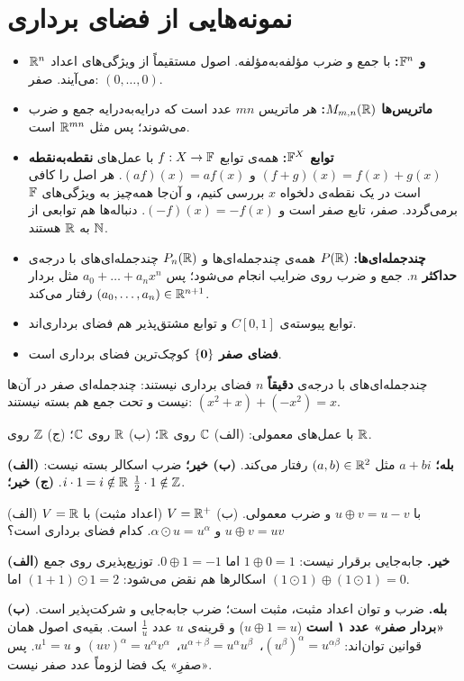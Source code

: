 \section{نمونه‌هایی از فضای برداری}

\begin{itemize}
  \item \textbf{$\mathbb{R}^n$ و $\mathbb{F}^n$:} با جمع و ضرب مؤلفه‌به‌مؤلفه. اصول مستقیماً از ویژگی‌های اعداد می‌آیند. صفر: $(0,\dots,0)$.
  \item \textbf{ماتریس‌ها $M_{m,n}(\mathbb{R})$:} هر ماتریس $mn$ عدد است که درایه‌به‌درایه جمع و ضرب می‌شوند؛ پس مثل $\mathbb{R}^{mn}$ است.
  \item \textbf{توابع $\mathbb{F}^X$:} همه‌ی توابع $f:X\to\mathbb{F}$ با عمل‌های \textbf{نقطه‌به‌نقطه}
  $(f+g)(x)=f(x)+g(x)$ و $(af)(x)=af(x)$. هر اصل را کافی است در یک نقطه‌ی دلخواه $x$ بررسی کنیم، و آن‌جا همه‌چیز به ویژگی‌های $\mathbb{F}$ برمی‌گردد. صفر، تابع صفر است و $(-f)(x)=-f(x)$. دنباله‌ها هم توابعی از $\mathbb{N}$ به $\mathbb{R}$ هستند.
  \item \textbf{چندجمله‌ای‌ها:} $P(\mathbb{R})$ همه‌ی چندجمله‌ای‌ها و $P_n(\mathbb{R})$ چندجمله‌ای‌های با درجه‌ی \textbf{حداکثر} $n$. جمع و ضرب روی ضرایب انجام می‌شود؛ پس $a_0+\dots+a_nx^n$ مثل بردار $(a_0,\dots,a_n)\in\mathbb{R}^{n+1}$ رفتار می‌کند.
  \item توابع پیوسته‌ی $C[0,1]$ و توابع مشتق‌پذیر هم فضای برداری‌اند.
  \item \textbf{فضای صفر} $\{\mathbf{0}\}$ کوچک‌ترین فضای برداری است.
\end{itemize}

\begin{warning}
چندجمله‌ای‌های با درجه‌ی \textbf{دقیقاً} $n$ فضای برداری نیستند: چندجمله‌ای صفر در آن‌ها نیست و تحت جمع هم بسته نیستند: $(x^2+x)+(-x^2)=x$.
\end{warning}

\begin{example}
با عمل‌های معمولی: (الف) $\mathbb{C}$ روی $\mathbb{R}$؛ (ب) $\mathbb{R}$ روی $\mathbb{C}$؛ (ج) $\mathbb{Z}$ روی $\mathbb{R}$.
\end{example}
\begin{solution}
\textbf{(الف) بله؛} $a+bi$ مثل $(a,b)\in\mathbb{R}^2$ رفتار می‌کند.
\textbf{(ب) خیر؛} ضرب اسکالر بسته نیست: $i\cdot1=i\notin\mathbb{R}$.
\textbf{(ج) خیر؛} $\frac12\cdot1\notin\mathbb{Z}$.
\end{solution}

\begin{example}
(الف) $V=\mathbb{R}$ با $u\oplus v=u-v$ و ضرب معمولی. (ب) $V=\mathbb{R}^{+}$ (اعداد مثبت) با $u\oplus v=uv$ و $\alpha\odot u=u^\alpha$. کدام فضای برداری است؟
\end{example}
\begin{solution}
\textbf{(الف) خیر.} جابه‌جایی برقرار نیست: $1\oplus0=1$ اما $0\oplus1=-1$. توزیع‌پذیری روی جمع اسکالرها هم نقض می‌شود: $(1+1)\odot1=2$ اما $(1\odot1)\oplus(1\odot1)=0$.

\textbf{(ب) بله.} ضرب و توان اعداد مثبت، مثبت است؛ ضرب جابه‌جایی و شرکت‌پذیر است.
\textbf{«بردار صفر» عدد ۱ است} ($u\oplus1=u$) و قرینه‌ی $u$ عدد $\frac1u$ است. بقیه‌ی اصول همان قوانین توان‌اند:
$(u^\beta)^\alpha=u^{\alpha\beta}$،\ $u^{\alpha+\beta}=u^\alpha u^\beta$،\ $(uv)^\alpha=u^\alpha v^\alpha$ و $u^1=u$.
پس «صفرِ» یک فضا لزوماً عدد صفر نیست.
\end{solution}

